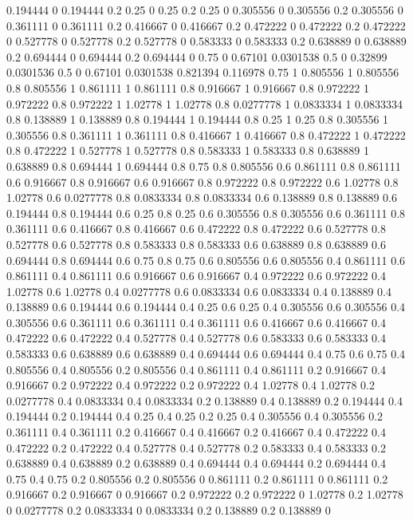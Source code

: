 0.194444 0
0.194444 0.2
0.25 0
0.25 0.2
0.25 0
0.305556 0
0.305556 0.2
0.305556 0
0.361111 0
0.361111 0.2
0.416667 0
0.416667 0.2
0.472222 0
0.472222 0.2
0.472222 0
0.527778 0
0.527778 0.2
0.527778 0
0.583333 0
0.583333 0.2
0.638889 0
0.638889 0.2
0.694444 0
0.694444 0.2
0.694444 0
0.75 0
0.67101 0.0301538
0.5 0
0.32899 0.0301536
0.5 0
0.67101 0.0301538
0.821394 0.116978
0.75 1
0.805556 1
0.805556 0.8
0.805556 1
0.861111 1
0.861111 0.8
0.916667 1
0.916667 0.8
0.972222 1
0.972222 0.8
0.972222 1
1.02778 1
1.02778 0.8
0.0277778 1
0.0833334 1
0.0833334 0.8
0.138889 1
0.138889 0.8
0.194444 1
0.194444 0.8
0.25 1
0.25 0.8
0.305556 1
0.305556 0.8
0.361111 1
0.361111 0.8
0.416667 1
0.416667 0.8
0.472222 1
0.472222 0.8
0.472222 1
0.527778 1
0.527778 0.8
0.583333 1
0.583333 0.8
0.638889 1
0.638889 0.8
0.694444 1
0.694444 0.8
0.75 0.8
0.805556 0.6
0.861111 0.8
0.861111 0.6
0.916667 0.8
0.916667 0.6
0.916667 0.8
0.972222 0.8
0.972222 0.6
1.02778 0.8
1.02778 0.6
0.0277778 0.8
0.0833334 0.8
0.0833334 0.6
0.138889 0.8
0.138889 0.6
0.194444 0.8
0.194444 0.6
0.25 0.8
0.25 0.6
0.305556 0.8
0.305556 0.6
0.361111 0.8
0.361111 0.6
0.416667 0.8
0.416667 0.6
0.472222 0.8
0.472222 0.6
0.527778 0.8
0.527778 0.6
0.527778 0.8
0.583333 0.8
0.583333 0.6
0.638889 0.8
0.638889 0.6
0.694444 0.8
0.694444 0.6
0.75 0.8
0.75 0.6
0.805556 0.6
0.805556 0.4
0.861111 0.6
0.861111 0.4
0.861111 0.6
0.916667 0.6
0.916667 0.4
0.972222 0.6
0.972222 0.4
1.02778 0.6
1.02778 0.4
0.0277778 0.6
0.0833334 0.6
0.0833334 0.4
0.138889 0.4
0.138889 0.6
0.194444 0.6
0.194444 0.4
0.25 0.6
0.25 0.4
0.305556 0.6
0.305556 0.4
0.305556 0.6
0.361111 0.6
0.361111 0.4
0.361111 0.6
0.416667 0.6
0.416667 0.4
0.472222 0.6
0.472222 0.4
0.527778 0.4
0.527778 0.6
0.583333 0.6
0.583333 0.4
0.583333 0.6
0.638889 0.6
0.638889 0.4
0.694444 0.6
0.694444 0.4
0.75 0.6
0.75 0.4
0.805556 0.4
0.805556 0.2
0.805556 0.4
0.861111 0.4
0.861111 0.2
0.916667 0.4
0.916667 0.2
0.972222 0.4
0.972222 0.2
0.972222 0.4
1.02778 0.4
1.02778 0.2
0.0277778 0.4
0.0833334 0.4
0.0833334 0.2
0.138889 0.4
0.138889 0.2
0.194444 0.4
0.194444 0.2
0.194444 0.4
0.25 0.4
0.25 0.2
0.25 0.4
0.305556 0.4
0.305556 0.2
0.361111 0.4
0.361111 0.2
0.416667 0.4
0.416667 0.2
0.416667 0.4
0.472222 0.4
0.472222 0.2
0.472222 0.4
0.527778 0.4
0.527778 0.2
0.583333 0.4
0.583333 0.2
0.638889 0.4
0.638889 0.2
0.638889 0.4
0.694444 0.4
0.694444 0.2
0.694444 0.4
0.75 0.4
0.75 0.2
0.805556 0.2
0.805556 0
0.861111 0.2
0.861111 0
0.861111 0.2
0.916667 0.2
0.916667 0
0.916667 0.2
0.972222 0.2
0.972222 0
1.02778 0.2
1.02778 0
0.0277778 0.2
0.0833334 0
0.0833334 0.2
0.138889 0.2
0.138889 0
